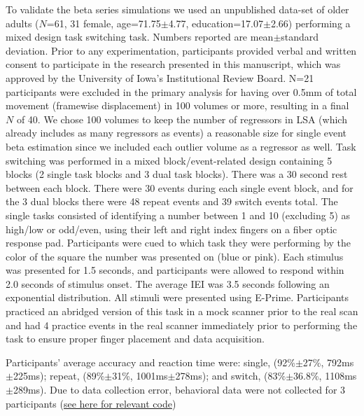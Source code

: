 \documentclass[phd,figures,tables,ackpage,abstractpage,publicabstractpage]{uithesis}
\begin{document}
To validate the beta series simulations we used an unpublished data-set
of older adults ($N$=61, 31 female, age=71.75$\pm$4.77, education=17.07$\pm$2.66)
performing a mixed design task switching task.
Numbers reported are mean$\pm$standard deviation.
Prior to any experimentation, participants provided verbal and written consent
to participate in the research presented in this manuscript, which was approved
by the University of Iowa's Institutional Review Board.
N=21 participants were excluded in the primary analysis for having over
0.5mm of total movement (framewise displacement) in 100 volumes or more,
resulting in a final $N$ of 40.
We chose 100 volumes to keep the number of regressors in LSA
(which already includes as many regressors as events) a reasonable size
for single event beta estimation since we included each outlier volume
as a regressor as well.
Task switching was performed in a mixed block/event-related design containing
5 blocks (2 single task blocks and 3 dual task blocks).
There was a 30 second rest between each block.
There were 30 events during each single event block,
and for the 3 dual blocks there were 48 repeat events and 39 switch events total.
The single tasks consisted of identifying a number between
1 and 10 (excluding 5) as high/low or odd/even, using their left and right index fingers
on a fiber optic response pad.
Participants were cued to which task they were performing by the color of the square
the number was presented on (blue or pink).
Each stimulus was presented for 1.5 seconds, and participants were allowed
to respond within 2.0 seconds of stimulus onset.
The average IEI was 3.5 seconds following an exponential distribution.
All stimuli were presented using E-Prime.
Participants practiced an abridged version of this task in a mock scanner
prior to the real scan and had 4 practice events in the real scanner immediately
prior to performing the task to ensure proper finger placement and data acquisition.

Participants' average accuracy and reaction time were:
single, (92\%$\pm$27\%, 792ms$\pm$225ms); repeat, (89\%$\pm$31\%, 1001ms$\pm$278ms);
and switch, (83\%$\pm$36.8\%, 1108ms$\pm$289ms).
Due to data collection error, behavioral data were not collected for 3 participants
(\href{https://github.com/jdkent/BetaSeriesRealDataAnalysis/blob/b18b44321edf7b662a1e5ea635f64452c8d3644c/summarizeBehavior/summarize_behavior.ipynb}{see here for relevant code})
\end{document}
